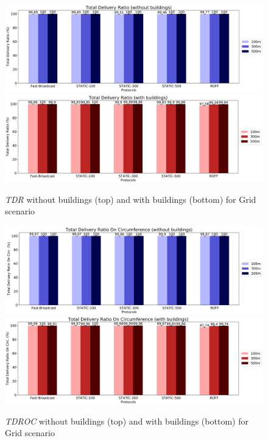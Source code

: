 		\begin{figure}[H]
			\centering
			\includegraphics[width=1.0\textwidth]{immagini/grid-300/b0/tdr}
			\includegraphics[width=1.0\textwidth]{immagini/grid-300/b1/tdr}
			\caption{\textit{TDR} without buildings (top) and with buildings (bottom) for Grid scenario}
			\label{fig:grid-tdr}
		\end{figure}
		
		\begin{figure}[H]
			\centering
			\includegraphics[width=1.0\textwidth]{immagini/grid-300/b0/tdroc}
			\includegraphics[width=1.0\textwidth]{immagini/grid-300/b1/tdroc}
			\caption{\textit{TDROC} without buildings (top) and with buildings (bottom) for Grid scenario}
			\label{fig:grid-tdroc}
		\end{figure}
	

